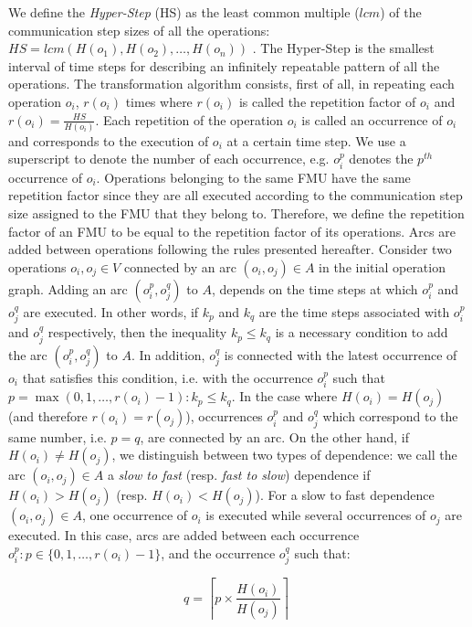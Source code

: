 We define the \textit{Hyper-Step} (HS) as the least common multiple ($lcm$) of the communication step sizes of all the operations: $HS=lcm(H(o_1),H(o_2), \dots ,H(o_n))$%
. The Hyper-Step is the smallest interval of time steps for describing an infinitely repeatable pattern of all the operations. The transformation algorithm consists, first of all, in repeating each operation $o_i$, $r(o_i)$ times where $r(o_i)$ is called the repetition factor of $o_i$ and $r(o_i) = \frac{HS}{H(o_i)}$. Each repetition of the operation $o_i$ is called an occurrence of $o_i$ and corresponds to the execution of $o_i$ at a certain time step. We use a superscript to denote the number of each occurrence, e.g. $o_i^p$ denotes the $p^{th}$ occurrence of $o_i$. Operations belonging to the same FMU have the same repetition factor since they are all executed according to the communication step size assigned to the FMU that they belong to. Therefore, we define the repetition factor of an FMU to be equal to the repetition factor of its operations. Arcs are added between operations following the rules presented hereafter. Consider two operations $o_i, o_j \in V$ connected by an arc $(o_i,o_j) \in A$ in the initial operation graph. Adding an arc $(o_i^p,o_j^q)$ to $A$, depends on the time steps at which $o_i^p$ and $o_j^q$ are executed. In other words, if $k_{p}$ and $k_{q}$ are the time steps associated with $o_i^p$ and $o_j^q$ respectively, then the inequality $k_{p} \leq k_{q}$ is a necessary condition to add the arc $(o_i^p,o_j^q)$ to $A$. In addition, $o_j^q$ is connected with the latest occurrence of $o_i$ that satisfies this condition, i.e. with the occurrence $o_i^p$ such that $p=\max(0,1, \dots ,r(o_i)-1) : k_{p} \leq k_{q}$. In the case where $H(o_i) = H(o_j)$ (and therefore $r(o_i) = r(o_j)$), occurrences $o_i^p$ and $o_j^q$ which correspond to the same number, i.e. $p = q$, are connected by an arc. On the other hand, if $H(o_i) \neq H(o_j)$, we distinguish between two types of dependence: we call the arc $(o_i,o_j) \in A$ a \textit{slow to fast} (resp. \textit{fast to slow}) dependence if $H(o_i) > H(o_j)$ (resp. $H(o_i) < H(o_j)$). For a slow to fast dependence $(o_i,o_j) \in A$, one occurrence of $o_i$ is executed while several occurrences of $o_j$ are executed. In this case, arcs are added between each occurrence $o_i^p: p \in \{0,1, \dots ,r(o_i)-1\}$, and the occurrence $o_j^q$ such that:

\begin{equation}
q = \left \lceil{p \times \frac{H(o_i)}{H(o_j)}}\right \rceil\;
\end{equation}

